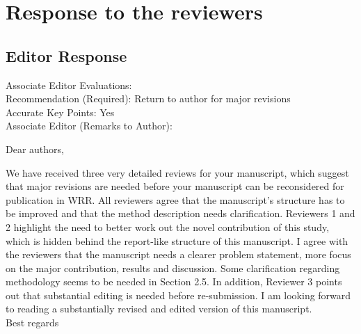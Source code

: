 \documentclass[11pt]{article}
\newcounter{reviewer}
\newcounter{point}[reviewer]
\begin{document}
\section*{Response to the reviewers}

\subsection*{Editor Response}

Associate Editor Evaluations: \\
Recommendation (Required): Return to author for major revisions \\
Accurate Key Points: Yes \\
\noindent
Associate Editor (Remarks to Author): 

Dear authors,

We have received three very detailed reviews for your manuscript, which suggest that major revisions are needed before your manuscript can be reconsidered for publication in WRR.
All reviewers agree that the manuscript's structure has to be improved and that the method description needs clarification.
Reviewers 1 and 2 highlight the need to better work out the novel contribution of this study, which is hidden behind the report-like structure of this manuscript.
I agree with the reviewers that the manuscript needs a clearer problem statement, more focus on the major contribution, results and discussion.
Some clarification regarding methodology seems to be needed in Section 2.5.
In addition, Reviewer 3 points out that substantial editing is needed before re-submission.
I am looking forward to reading a substantially revised and edited version of this manuscript.\\

Best regards
\end{document}
